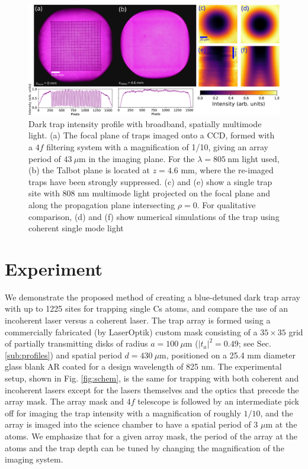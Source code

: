 \begin{figure}[!t]
    \centering
    \includegraphics[width=1\textwidth]{Images/figure3.eps}
    \caption{Dark trap intensity profile with broadband, spatially multimode light. (a) The focal plane of traps imaged onto a CCD, formed with a $4f$ filtering system with a magnification of 1/10, giving an array period of $43~\mu$m in the imaging plane. For the $\lambda= 805~ $nm light used, (b) the Talbot plane is located at $z=4.6$ mm, where the re-imaged traps have been strongly suppressed. (c) and (e) show a single trap site with 808 nm multimode light projected on the focal plane and along the propagation plane intersecting $\rho=0$. For qualitative comparison, (d) and (f) show numerical simulations of the trap using coherent single mode light}
    \label{fig:trap_intensity}
\end{figure}

\section{Experiment} \label{sec:exp}

We demonstrate the proposed method of creating a blue-detuned dark trap array with up to 1225 sites for trapping single Cs atoms, and compare the use of an incoherent laser versus a coherent laser. The trap array is formed using a commercially fabricated (by LaserOptik) custom mask consisting of a $35 \times 35$ grid of partially transmitting disks of radius  $a=100~\mu$m ($|t_a|^2 = 0.49$; see Sec. \ref{sub:profiles}) and spatial period $d=430~\mu \textrm{m}$, positioned on a 25.4 mm diameter glass blank AR coated for a design wavelength of 825 nm. The experimental setup, shown in Fig. \ref{fig:schem}, is the same for trapping with both coherent and incoherent lasers except for the lasers themselves and the optics that precede the array mask. The array mask and $4f$ telescope is followed by an intermediate pick off for imaging the trap intensity with a magnification of roughly $1/10$, and the array is imaged into the science chamber to have a spatial period of 3 $\mu \mathrm{m}$ at the atoms. We emphasize that for a given array mask, the period of the array at the atoms and the trap depth can be tuned by changing the magnification of the imaging system.

